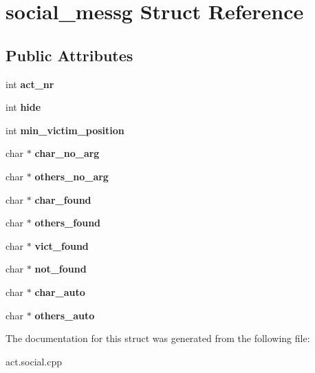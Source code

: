 \hypertarget{structsocial__messg}{}\section{social\+\_\+messg Struct Reference}
\label{structsocial__messg}
\subsection*{Public Attributes}
\begin{DoxyCompactItemize}
\item 
\mbox{\label{structsocial__messg_af9cd953f8c9529781951b65d99e9ae74}} 
int {\bfseries act\+\_\+nr}
\item 
\mbox{\label{structsocial__messg_a1c7d35e3e07d7c22125821537df2613f}} 
int {\bfseries hide}
\item 
\mbox{\label{structsocial__messg_a28daf1c9c8663d27924fd63d6ded5b33}} 
int {\bfseries min\+\_\+victim\+\_\+position}
\item 
\mbox{\label{structsocial__messg_a39ccd7ed46ce2471def2624db850d193}} 
char $\ast$ {\bfseries char\+\_\+no\+\_\+arg}
\item 
\mbox{\label{structsocial__messg_a56e866362ab700fec9cad734def6d0fa}} 
char $\ast$ {\bfseries others\+\_\+no\+\_\+arg}
\item 
\mbox{\label{structsocial__messg_aa2eb3c7391cf4a0c22ef651f46584ada}} 
char $\ast$ {\bfseries char\+\_\+found}
\item 
\mbox{\label{structsocial__messg_a6fb2fb7dc2a18d2449feca47ba607750}} 
char $\ast$ {\bfseries others\+\_\+found}
\item 
\mbox{\label{structsocial__messg_aa282e21ecfe7ee938260fc0e18b21c2d}} 
char $\ast$ {\bfseries vict\+\_\+found}
\item 
\mbox{\label{structsocial__messg_a05dd29529efe6a76e95f2aac4ef139ca}} 
char $\ast$ {\bfseries not\+\_\+found}
\item 
\mbox{\label{structsocial__messg_aef1e96c6dcf39678fea5096dea5930f7}} 
char $\ast$ {\bfseries char\+\_\+auto}
\item 
\mbox{\label{structsocial__messg_ae56c9b71ffa5810ae98f00093dccd56c}} 
char $\ast$ {\bfseries others\+\_\+auto}
\end{DoxyCompactItemize}


The documentation for this struct was generated from the following file\+:\begin{DoxyCompactItemize}
\item 
act.\+social.\+cpp\end{DoxyCompactItemize}
